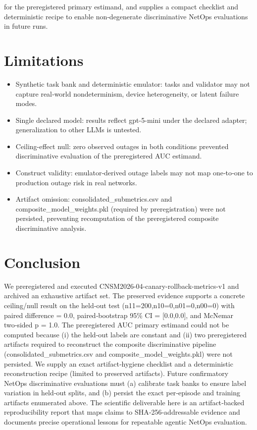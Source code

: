 \documentclass[conference]{IEEEtran}
\begin{document}
for the preregistered primary estimand, and supplies a compact checklist and deterministic recipe to enable non‑degenerate discriminative NetOps evaluations in future runs.

\section{Limitations}
\begin{itemize}
\item Synthetic task bank and deterministic emulator: tasks and validator may not capture real‑world nondeterminism, device heterogeneity, or latent failure modes.
\item Single declared model: results reflect gpt-5-mini under the declared adapter; generalization to other LLMs is untested.
\item Ceiling-effect null: zero observed outages in both conditions prevented discriminative evaluation of the preregistered AUC estimand.
\item Construct validity: emulator‑derived outage labels may not map one‑to‑one to production outage risk in real networks.
\item Artifact omission: consolidated\_submetrics.csv and composite\_model\_weights.pkl (required by preregistration) were not persisted, preventing recomputation of the preregistered composite discriminative analysis.
\end{itemize}

\section{Conclusion}
We preregistered and executed CNSM2026-04-canary-rollback-metrics-v1 and archived an exhaustive artifact set. The preserved evidence supports a concrete ceiling/null result on the held‑out test (n11=200,n10=0,n01=0,n00=0) with paired difference = 0.0, paired‑bootstrap 95\% CI = [0.0,0.0], and McNemar two‑sided p = 1.0. The preregistered AUC primary estimand could not be computed because (i) the held‑out labels are constant and (ii) two preregistered artifacts required to reconstruct the composite discriminative pipeline (consolidated\_submetrics.csv and composite\_model\_weights.pkl) were not persisted. We supply an exact artifact‑hygiene checklist and a deterministic reconstruction recipe (limited to preserved artifacts). Future confirmatory NetOps discriminative evaluations must (a) calibrate task banks to ensure label variation in held‑out splits, and (b) persist the exact per‑episode and training artifacts enumerated above. The scientific deliverable here is an artifact‑backed reproducibility report that maps claims to SHA‑256‑addressable evidence and documents precise operational lessons for repeatable agentic NetOps evaluation.
\end{document}
